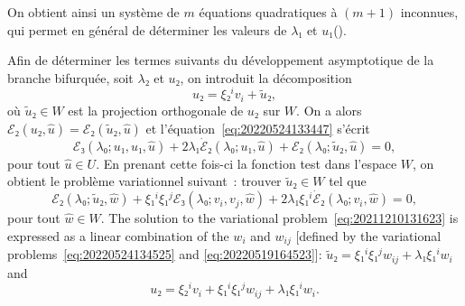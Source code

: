 \documentclass[12pt, final]{scrartcl}
\theoremstyle{definition}
\begin{document}
On obtient ainsi un système de \(m\) équations quadratiques à \((m + 1)\)
inconnues, qui permet en général de déterminer les valeurs de \(λ₁\) et
\(u₁\)().

Afin de déterminer les termes suivants du développement asymptotique de la
branche bifurquée, soit \(λ₂\) et \(u₂\), on introduit la décomposition
\begin{equation}
  u₂ = ξ₂^i v_i + \tilde{u}₂,
\end{equation}
où \(\tilde{u}₂∈W\) est la projection orthogonale de \(u₂\) sur \(W\). On a
alors \(ℰ₂(u₂, \hat{u}) =ℰ₂(\tilde{u}₂, \hat{u})\) et
l'équation~\eqref{eq:20220524133447} s'écrit
\begin{equation}
 ℰ₃(λ₀; u₁, u₁, \hat{u}) + 2λ₁ \dot{ℰ}₂(λ₀; u₁, \hat{u}) + ℰ₂(λ₀; \tilde{u}₂, \hat{u}) = 0,
\end{equation}
pour tout \(\hat{u}∈U\). En prenant cette fois-ci la fonction test dans l'espace
\(W\), on obtient le problème variationnel suivant~: trouver \(\tilde{u}₂∈W\)
tel que
\begin{equation}
  \label{eq:20211210131623}
  ℰ₂(λ₀; \tilde{u}₂, \hat{w}) + ξ₁^i ξ₁^j ℰ₃(λ₀; v_i, v_j, \hat{w}) + 2λ₁ ξ₁^i \dot{ℰ}₂(λ₀; v_i, \hat{w}) = 0,
\end{equation}
pour tout \(\hat{w}∈W\). The solution to the variational
problem~\eqref{eq:20211210131623} is expressed as a linear combination of the
\(w_i\) and \(w_{ij}\) [defined by the variational
problems~\eqref{eq:20220524134525} and \eqref{eq:20220519164523}]: \(\tilde{u}₂ = ξ₁^i ξ₁^j w_{ij} + λ₁ ξ₁^i w_i\) and
\begin{equation}
  \label{eq:20220524134613}
  u₂ = ξ₂^i v_i + ξ₁^i ξ₁^j w_{ij} + λ₁ ξ₁^i w_i.
\end{equation}
\end{document}
